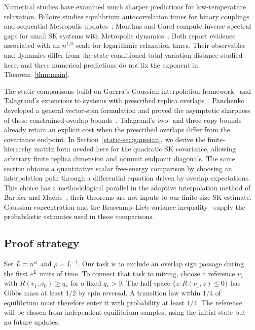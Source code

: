 Numerical studies have examined much sharper predictions for
low-temperature relaxation. Billoire studies equilibrium
autocorrelation times for binary couplings and sequential Metropolis
updates~\cite{Billoire10}; Monthus and Garel compute inverse spectral
gaps for small SK systems with Metropolis
dynamics~\cite{MonthusGarel09}. Both report evidence associated with
an $n^{1/3}$ scale for logarithmic relaxation times. Their observables
and dynamics differ from the state-conditioned total variation
distance studied here, and these numerical predictions do not fix
the exponent in Theorem~\ref{thm:main}.

The static comparisons build on Guerra's Gaussian interpolation
framework~\cite{Guerra03} and Talagrand's extensions to systems with
prescribed replica overlaps~\cite[Propositions~3.4 and~4.4]{Talagrand07}.
Panchenko developed a general vector-spin formulation and proved the
asymptotic sharpness of these constrained-overlap
bounds~\cite{Panchenko18}. Talagrand's two- and three-copy bounds already
retain an explicit cost when the prescribed overlaps differ from the
covariance endpoint. In Section~\ref{static-sec:gaussian}, we derive the
finite-hierarchy matrix form needed here for the quadratic SK covariance,
allowing arbitrary finite replica dimension and nonunit endpoint
diagonals. The same section obtains a
quantitative scalar free-energy comparison by choosing an interpolation
path through a differential equation driven by overlap expectations.
This choice has a methodological parallel in the adaptive
interpolation method of Barbier and Macris~\cite{BarbierMacris19};
their theorems are not inputs to our finite-size SK estimate.
Gaussian concentration and the Brascamp--Lieb variance
inequality~\cite{BL76} supply the probabilistic estimates used in
these comparisons.

\subsection{Proof strategy}

Set $L=n^\kappa$ and $\rho=L^{-1}$. Our task is to exclude an overlap
sign passage during the first $e^L$ units of time. To connect that task
to mixing, choose a reference $v_1$ with $R(v_1,x_0)\ge q_*$ for a
fixed $q_*>0$. The half-space $\{z:R(v_1,z)\le0\}$ has Gibbs mass at
least $1/2$ by spin reversal. A transition law within $1/4$ of
equilibrium must therefore enter it with probability at least $1/4$.
The reference will be chosen from independent equilibrium samples,
using the initial state but no future updates.

